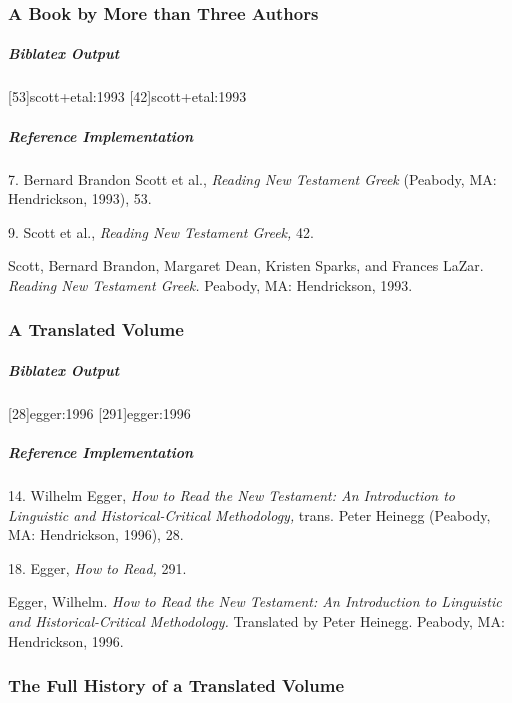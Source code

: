 \documentclass[a4paper]{article}
\newenvironment{biboutput}{%
  \subparagraph{Biblatex Output}
}{\color{black}}
\newenvironment{refimp}{%
  \subparagraph{Reference Implementation}
  \color{reference-colour}
  \rm
}{\par\color{black}}
\begin{document}
\subsubsection{A Book by More than Three Authors}

\begin{biboutput}
  [53]{scott+etal:1993}
  [42]{scott+etal:1993}
\end{biboutput}

\begin{refimp}
  \hspace*{\bibindent}7. Bernard Brandon Scott et al., \emph{Reading New
  Testament Greek} (Peabody, MA: Hendrickson, 1993), 53.
  
  \hspace*{\bibindent}9. Scott et al., \emph{Reading New Testament Greek,} 42.

  \hangindent\bibindent Scott, Bernard Brandon, Margaret Dean, Kristen Sparks,
  and Frances LaZar. \emph{Reading New Testament Greek.} Peabody, MA:
  Hendrickson, 1993.
\end{refimp}

\subsubsection{A Translated Volume}

\begin{biboutput}
  [28]{egger:1996}
  [291]{egger:1996}
\end{biboutput}

\begin{refimp}
  \hspace*{\bibindent}14. Wilhelm Egger, \emph{How to Read the New Testament:
  An Introduction to Linguistic and Historical-Critical Methodology,} trans.\@
  Peter Heinegg (Peabody, MA: Hendrickson, 1996), 28.

  \hspace*{\bibindent}18. Egger, \emph{How to Read,} 291.
  
  \hangindent\bibindent Egger, Wilhelm. \emph{How to Read the New Testament:
  An Introduction to Linguistic and Historical-Critical Methodology.}
  Translated by Peter Heinegg. Peabody, MA: Hendrickson, 1996.
\end{refimp}

\subsubsection{The Full History of a Translated Volume}
\end{document}
